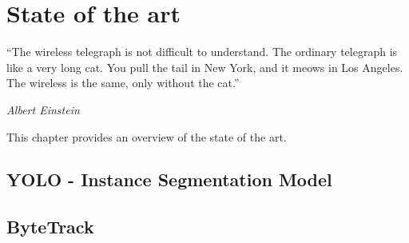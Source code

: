 \chapter{State of the art}
\label{c:sota}

\epigraph{\enquote{The wireless telegraph is not difficult to understand. The ordinary telegraph is like a very long cat. You pull the tail in New York, and it meows in Los Angeles. The wireless is the same, only without the cat.}}{\emph{Albert Einstein}}

This chapter provides an overview of the state of the art.
\section{YOLO - Instance Segmentation Model}
\label{sec:instance_segmentation}

\section{ByteTrack}
\label{sec:byte_track}